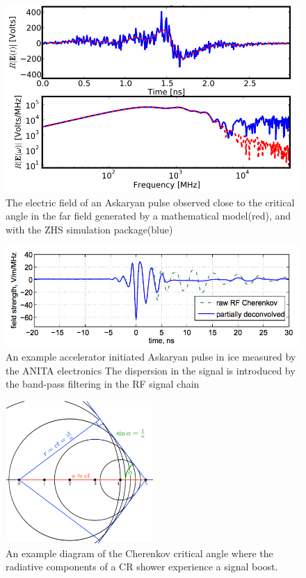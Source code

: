 		
\begin{figure}
\centering
	\includegraphics[width=\textwidth]{figures/AskaryanSimulation}
	\caption{The electric field of an Askaryan pulse observed close to the critical angle in the far field generated by a mathematical model(red), and with the ZHS simulation package(blue) \cite{PhysRevD.84.103003} }
	\label{fig:AskaryanSimulation}
\end{figure}

\begin{figure}
\centering
	\includegraphics[width=\textwidth]{figures/ANITASLACImpulse}
	\caption{An example accelerator initiated Askaryan pulse in ice measured by the ANITA electronics  The dispersion in the signal is introduced by the band-pass filtering in the RF signal chain\cite{PhysRevLett.99.171101} }
	\label{fig:ANITASLACPulse}
\end{figure}


\begin{figure}
\centering
	\includegraphics[width=0.5\textwidth]{figures/Cherenkov}
	\caption{An example diagram of the Cherenkov critical angle where the radiative components of a CR shower experience a signal boost.}
	\label{fig:Cherenkov}
\end{figure}


